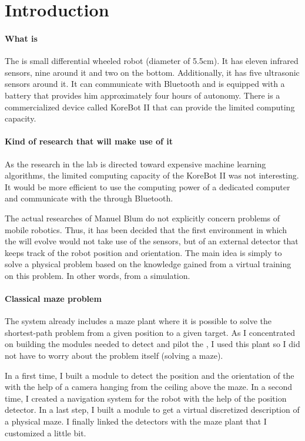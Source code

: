 \chapter{Introduction}

\subsubsection{What is \khepera{}}
The \khepera{} is small differential wheeled robot (diameter of 5.5cm). 
It has eleven infrared sensors, nine around it and two on the bottom. 
Additionally, it has five ultrasonic sensors around it. It can communicate 
with Bluetooth and is equipped with a battery that provides him 
approximately four hours of autonomy. There is a commercialized device 
called KoreBot II that can provide the \khepera{} limited computing 
capacity. 

\subsubsection{Kind of research that will make use of it}
As the research in the lab is directed toward expensive machine learning 
algorithms, the limited computing capacity of the KoreBot II was not 
interesting. It would be more efficient to use the computing power of 
a dedicated computer and communicate with the \khepera{} through 
Bluetooth.

The actual researches of Manuel Blum do not explicitly concern problems 
of mobile robotics. Thus, it has been decided that the first environment 
in which the \khepera{} will evolve would not take use of the sensors, 
but of an external detector that keeps track of the robot position and 
orientation. The main idea is simply to solve a physical problem based 
on the knowledge gained from a virtual training on this problem. In 
other words, from a simulation.

\subsubsection{Classical maze problem}
The \clsquare{} system already includes a maze plant where it is possible 
to solve the shortest-path problem from a given position to a given 
target. As I concentrated on building the modules needed to detect and 
pilot the \khepera{}, I used this plant so I did not have to worry 
about the problem itself (solving a maze).

In a first time, I built a module to detect the position and the 
orientation of the \khepera{} with the help of a camera hanging from 
the ceiling above the maze. In a second time, I created a navigation 
system for the robot with the help of the position detector. In a 
last step, I built a module to get a virtual discretized description 
of a physical maze. I finally linked the detectors with the maze plant 
that I customized a little bit.

